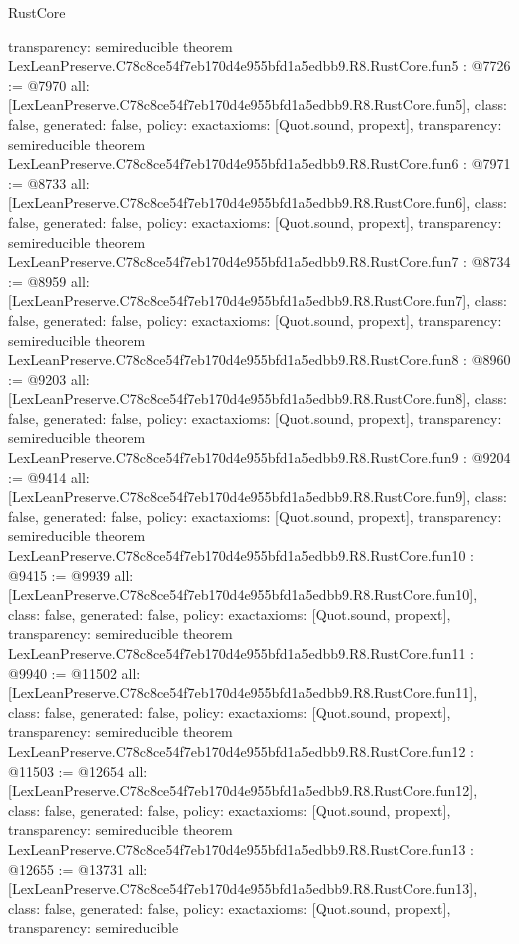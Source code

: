 \begin{lexlean}{RustCore}
\begin{coremodule}
{  transparency: semireducible
}
theorem LexLeanPreserve.C78c8ce54f7eb170d4e955bfd1a5edbb9.R8.RustCore.fun5 : @7726 := @7970 {
  all: [LexLeanPreserve.C78c8ce54f7eb170d4e955bfd1a5edbb9.R8.RustCore.fun5],
  class: false,
  generated: false,
  policy: exact{axioms: [Quot.sound, propext]},
  transparency: semireducible
}
theorem LexLeanPreserve.C78c8ce54f7eb170d4e955bfd1a5edbb9.R8.RustCore.fun6 : @7971 := @8733 {
  all: [LexLeanPreserve.C78c8ce54f7eb170d4e955bfd1a5edbb9.R8.RustCore.fun6],
  class: false,
  generated: false,
  policy: exact{axioms: [Quot.sound, propext]},
  transparency: semireducible
}
theorem LexLeanPreserve.C78c8ce54f7eb170d4e955bfd1a5edbb9.R8.RustCore.fun7 : @8734 := @8959 {
  all: [LexLeanPreserve.C78c8ce54f7eb170d4e955bfd1a5edbb9.R8.RustCore.fun7],
  class: false,
  generated: false,
  policy: exact{axioms: [Quot.sound, propext]},
  transparency: semireducible
}
theorem LexLeanPreserve.C78c8ce54f7eb170d4e955bfd1a5edbb9.R8.RustCore.fun8 : @8960 := @9203 {
  all: [LexLeanPreserve.C78c8ce54f7eb170d4e955bfd1a5edbb9.R8.RustCore.fun8],
  class: false,
  generated: false,
  policy: exact{axioms: [Quot.sound, propext]},
  transparency: semireducible
}
theorem LexLeanPreserve.C78c8ce54f7eb170d4e955bfd1a5edbb9.R8.RustCore.fun9 : @9204 := @9414 {
  all: [LexLeanPreserve.C78c8ce54f7eb170d4e955bfd1a5edbb9.R8.RustCore.fun9],
  class: false,
  generated: false,
  policy: exact{axioms: [Quot.sound, propext]},
  transparency: semireducible
}
theorem LexLeanPreserve.C78c8ce54f7eb170d4e955bfd1a5edbb9.R8.RustCore.fun10 : @9415 := @9939 {
  all: [LexLeanPreserve.C78c8ce54f7eb170d4e955bfd1a5edbb9.R8.RustCore.fun10],
  class: false,
  generated: false,
  policy: exact{axioms: [Quot.sound, propext]},
  transparency: semireducible
}
theorem LexLeanPreserve.C78c8ce54f7eb170d4e955bfd1a5edbb9.R8.RustCore.fun11 : @9940 := @11502 {
  all: [LexLeanPreserve.C78c8ce54f7eb170d4e955bfd1a5edbb9.R8.RustCore.fun11],
  class: false,
  generated: false,
  policy: exact{axioms: [Quot.sound, propext]},
  transparency: semireducible
}
theorem LexLeanPreserve.C78c8ce54f7eb170d4e955bfd1a5edbb9.R8.RustCore.fun12 : @11503 := @12654 {
  all: [LexLeanPreserve.C78c8ce54f7eb170d4e955bfd1a5edbb9.R8.RustCore.fun12],
  class: false,
  generated: false,
  policy: exact{axioms: [Quot.sound, propext]},
  transparency: semireducible
}
theorem LexLeanPreserve.C78c8ce54f7eb170d4e955bfd1a5edbb9.R8.RustCore.fun13 : @12655 := @13731 {
  all: [LexLeanPreserve.C78c8ce54f7eb170d4e955bfd1a5edbb9.R8.RustCore.fun13],
  class: false,
  generated: false,
  policy: exact{axioms: [Quot.sound, propext]},
  transparency: semireducible
}
\end{coremodule}
\end{lexlean}
